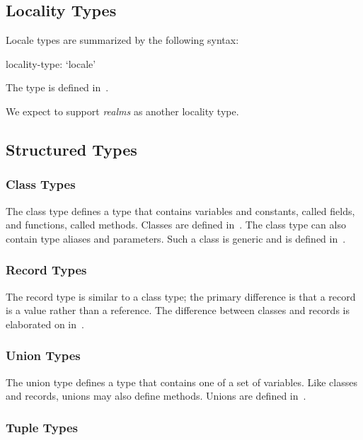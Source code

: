 \subsection{Locality Types}
\label{Locality_Types}

Locale types are summarized by the following syntax:

\begin{syntax}
locality-type:
  `locale'
\end{syntax}

The  type is defined in~.

\begin{openissue}
We expect to support \emph{realms} as another locality type.
\end{openissue}

\subsection{Structured Types}
\label{Structured_Types}

\subsubsection{Class Types}

The class type defines a type that contains variables and constants,
called fields, and functions, called methods.  Classes are defined
in~.  The class type can also contain type aliases and
parameters.  Such a class is generic and is defined
in~.

\subsubsection{Record Types}

The record type is similar to a class type; the primary difference is
that a record is a value rather than a reference.  The difference
between classes and records is elaborated on in~.

\subsubsection{Union Types}

The union type defines a type that contains one of a set of variables.
Like classes and records, unions may also define methods.  Unions are
defined in~.

\subsubsection{Tuple Types}

